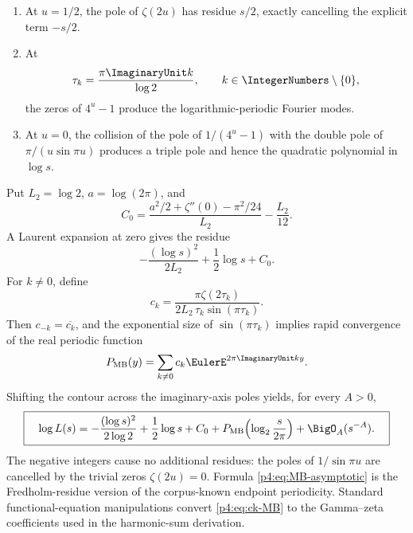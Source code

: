 \documentclass[11pt]{article}
\theoremstyle{definition}
\theoremstyle{remark}
\begin{document}
\begin{enumerate}[label=(\roman*),leftmargin=2.2em]
\item At \(u=1/2\), the pole of \(\zeta(2u)\) has residue \(s/2\), exactly cancelling
      the explicit term \(-s/2\).
\item At
\begin{equation}
 \tau_k=\frac{\pi\ImaginaryUnit k}{\log2},\qquad k\in\IntegerNumbers\setminus\{0\},
 \label{p4:eq:tau-k}
\end{equation}
      the zeros of \(4^u-1\) produce the logarithmic-periodic Fourier modes.
\item At \(u=0\), the collision of the pole of \(1/(4^u-1)\) with the double pole of
      \(\pi/(u\sin\pi u)\) produces a triple pole and hence the quadratic polynomial
      in \(\log s\).
\end{enumerate}

Put \(L_2=\log2\), \(a=\log(2\pi)\), and
\begin{equation}
 C_0=\frac{a^2/2+\zeta''(0)-\pi^2/24}{L_2}-\frac{L_2}{12}.
 \label{p4:eq:C0}
\end{equation}
A Laurent expansion at zero gives the residue
\begin{equation}
 -\frac{(\log s)^2}{2L_2}+\frac12\log s+C_0.
 \label{p4:eq:zero-residue}
\end{equation}
For \(k\ne0\), define
\begin{equation}
 c_k=\frac{\pi\zeta(2\tau_k)}
 {2L_2\,\tau_k\sin(\pi\tau_k)}.
 \label{p4:eq:ck-MB}
\end{equation}
Then \(c_{-k}=\overline{c_k}\), and the exponential size of
\(\sin(\pi\tau_k)\) implies rapid convergence of the real periodic function
\begin{equation}
 P_{\mathrm{MB}}(y)=\sum_{k\ne0}c_k\EulerE^{2\pi\ImaginaryUnit ky}.
 \label{p4:eq:P-MB}
\end{equation}
Shifting the contour across the imaginary-axis poles yields, for every \(A>0\),
\begin{equation}
 \boxed{\quad
 \log L(s)=-\frac{(\log s)^2}{2\log2}+\frac12\log s+C_0
 +P_{\mathrm{MB}}\!\left(\log_2\frac{s}{2\pi}\right)
 +\BigO_A(s^{-A}).
 \quad}
 \label{p4:eq:MB-asymptotic}
\end{equation}
The negative integers cause no additional residues: the poles of
\(1/\sin\pi u\) are cancelled by the trivial zeros \(\zeta(2u)=0\).  Formula
\eqref{p4:eq:MB-asymptotic} is the Fredholm-residue version of the corpus-known endpoint
periodicity.  Standard functional-equation manipulations convert
\eqref{p4:eq:ck-MB} to the Gamma--zeta coefficients used in the harmonic-sum derivation.
\end{document}
